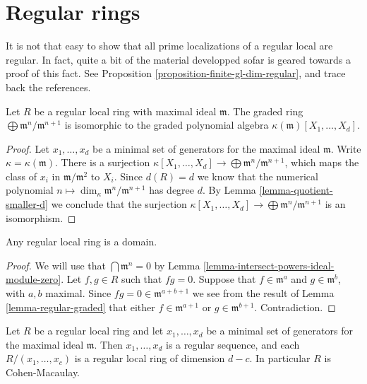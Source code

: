 \section{Regular rings}
\label{section-regular}

\noindent
It is not that easy to show that all prime localizations of a regular local
are regular. In fact, quite a bit of the material developped sofar is
geared towards a proof of this fact. See
Proposition \ref{proposition-finite-gl-dim-regular}, and
trace back the references.

\begin{lemma}
\label{lemma-regular-graded}
Let $R$ be a regular local ring with maximal ideal $\mathfrak m$.
The graded ring $\bigoplus \mathfrak m^n / \mathfrak m^{n+1}$
is isomorphic to the graded polynomial algebra
$\kappa(\mathfrak m)[X_1,\ldots,X_d]$.
\end{lemma}

\begin{proof}
Let $x_1,\ldots,x_d$ be a minimal set of generators
for the maximal ideal $\mathfrak m$.
Write $\kappa = \kappa(\mathfrak m)$.
There is a surjection $\kappa[X_1,\ldots,X_d]
\to \bigoplus \mathfrak m^n/\mathfrak m^{n+1}$,
which maps the class of $x_i$ in $\mathfrak m/\mathfrak m^2$
to $X_i$. Since $d(R) = d$ we know that the numerical
polynomial $n \mapsto \dim_\kappa \mathfrak m^n/\mathfrak m^{n+1}$
has degree $d$. By Lemma \ref{lemma-quotient-smaller-d} we 
conclude that the surjection $\kappa[X_1,\ldots,X_d]
\to \bigoplus \mathfrak m^n/\mathfrak m^{n+1}$ is an isomorphism.
\end{proof}

\begin{lemma}
\label{lemma-regular-domain}
Any regular local ring is a domain.
\end{lemma}

\begin{proof}
We will use that $\bigcap \mathfrak m^n = 0$
by Lemma \ref{lemma-intersect-powers-ideal-module-zero}.
Let $f, g \in R$ such that $fg = 0$.
Suppose that $f \in \mathfrak m^a$ and
$g \in \mathfrak m^b$, with $a,b$ maximal.
Since $fg = 0 \in \mathfrak m^{a+b+1}$
we see from the result of Lemma \ref{lemma-regular-graded}
that either $f \in \mathfrak m^{a+1}$ or
$g \in \mathfrak m^{b+1}$. Contradiction.
\end{proof}

\begin{lemma}
\label{lemma-regular-ring-CM}
Let $R$ be a regular local ring and let
$x_1,\ldots,x_d$ be a minimal set of generators
for the maximal ideal $\mathfrak m$. Then
$x_1,\ldots,x_d$ is a regular sequence, and
each $R/(x_1,\ldots,x_c)$ is a regular local ring
of dimension $d - c$. In particular $R$ is Cohen-Macaulay.
\end{lemma}

